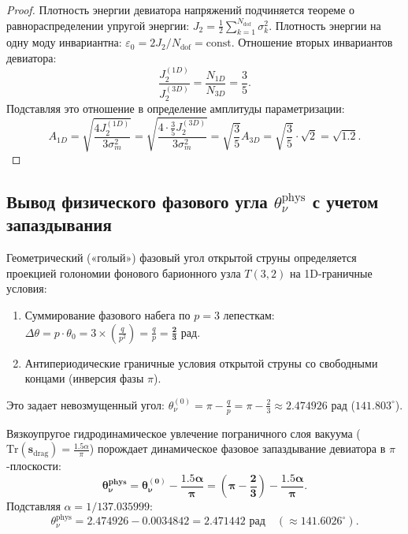 \documentclass[12pt,a4paper]{article}
\begin{document}
	\begin{proof}
		Плотность энергии девиатора напряжений подчиняется теореме о равнораспределении упругой энергии: $J_2 = \frac{1}{2}\sum_{k=1}^{N_{\text{dof}}} \sigma_k^2$. Плотность энергии на одну моду инвариантна: $\varepsilon_0 = 2 J_2 / N_{\text{dof}} = \mathrm{const}$. Отношение вторых инвариантов девиатора:
		\begin{equation}
			\frac{J_2^{(1D)}}{J_2^{(3D)}} = \frac{N_{1D}}{N_{3D}} = \frac{3}{5}.
		\end{equation}
		Подставляя это отношение в определение амплитуды параметризации:
		\begin{equation}
			A_{1D} = \sqrt{\frac{4 J_2^{(1D)}}{3 \sigma_m^2}} = \sqrt{\frac{4 \cdot \frac{3}{5} J_2^{(3D)}}{3 \sigma_m^2}} = \sqrt{\frac{3}{5}} A_{3D} = \sqrt{\frac{3}{5}} \cdot \sqrt{2} = \mathbf{\sqrt{1.2}}.
		\end{equation}
	\end{proof}
	
	\subsection{Вывод физического фазового угла $\theta_\nu^{\text{phys}}$ с учетом запаздывания}
	Геометрический («голый») фазовый угол открытой струны определяется проекцией голономии фонового барионного узла $T(3,2)$ на 1D-граничные условия:
	\begin{enumerate}
		\item Суммирование фазового набега по $p=3$ лепесткам: $\Delta \theta = p \cdot \theta_0 = 3 \times \left(\frac{q}{p^2}\right) = \frac{q}{p} = \mathbf{\frac{2}{3} \text{ рад}}$.
		\item Антипериодические граничные условия открытой струны со свободными концами (инверсия фазы $\pi$).
	\end{enumerate}
	Это задает невозмущенный угол: $\theta_\nu^{(0)} = \pi - \frac{q}{p} = \pi - \frac{2}{3} \approx 2.474926$ рад ($141.803^\circ$).
	
	Вязкоупругое гидродинамическое увлечение пограничного слоя вакуума ($\mathrm{Tr}(\mathbf{s}_{\text{drag}}) = \frac{1.5\alpha}{\pi}$) порождает динамическое фазовое запаздывание девиатора в $\pi$-плоскости:
	\begin{equation}
		\mathbf{\theta_\nu^{\text{phys}} = \theta_\nu^{(0)} - \frac{1.5\alpha}{\pi} = \left(\pi - \frac{2}{3}\right) - \frac{1.5\alpha}{\pi}}.
	\end{equation}
	Подставляя $\alpha = 1/137.035999$:
	\begin{equation}
		\theta_\nu^{\text{phys}} = 2.474926 - 0.0034842 = \mathbf{2.471442 \text{ рад}} \quad (\approx 141.6026^\circ).
	\end{equation}
	
\end{document}
